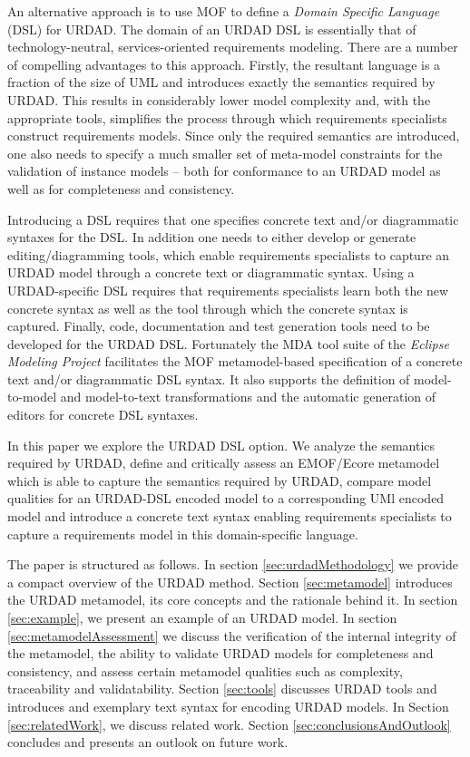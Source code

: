 An alternative approach is to use MOF to define a {\em Domain Specific Language} (DSL) for URDAD. The domain of an URDAD DSL is essentially that of technology-neutral, services-oriented requirements modeling. There are a number of compelling advantages to this approach. Firstly, the resultant language is a fraction of the size of UML and introduces exactly the semantics required by URDAD. This results in considerably lower model complexity and, with the appropriate tools, simplifies the process through which requirements specialists construct requirements models. Since only the required semantics are introduced, one also needs to specify a much smaller set of  meta-model constraints for the validation of instance models -- both for conformance to an URDAD model as well as for completeness and consistency.

Introducing a DSL requires that one specifies concrete text and/or diagrammatic syntaxes for the DSL. In addition one needs to either develop or generate editing/diagramming tools, which enable requirements specialists to capture an URDAD model through a concrete text or diagrammatic syntax. Using a URDAD-specific DSL requires that requirements specialists learn both the new concrete syntax as well as the tool through which the concrete syntax is captured. Finally, code, documentation and test generation tools need to be developed for the URDAD DSL. Fortunately the MDA tool suite of the {\em Eclipse Modeling Project} \cite{gronback_model_2008,} facilitates the MOF metamodel-based specification of a concrete text and/or diagrammatic DSL syntax. It also supports the definition of model-to-model and model-to-text transformations and the automatic generation of editors for concrete DSL syntaxes.



In this paper we explore the URDAD DSL option. We analyze the semantics required by URDAD, define and critically assess an EMOF/Ecore metamodel which is able to capture the semantics required by URDAD, compare model qualities for an URDAD-DSL encoded model to a corresponding UMl encoded model and introduce a concrete text syntax enabling requirements specialists to capture a requirements model in this domain-specific language.

The paper is structured as follows. In section \ref{sec:urdadMethodology} we provide a compact overview of the URDAD method. Section \ref{sec:metamodel} introduces the URDAD metamodel, its core concepts and the rationale behind it. In section \ref{sec:example}, we present an example of an URDAD model. In section \ref{sec:metamodelAssessment} we discuss the verification of the internal integrity of the metamodel, the ability to validate URDAD models for completeness and consistency, and assess certain metamodel qualities such as complexity, traceability and validatability. Section \ref{sec:tools} discusses URDAD tools and introduces and exemplary text syntax for encoding URDAD models. In Section \ref{sec:relatedWork}, we discuss related work. Section \ref{sec:conclusionsAndOutlook} concludes and presents an outlook on future work.


